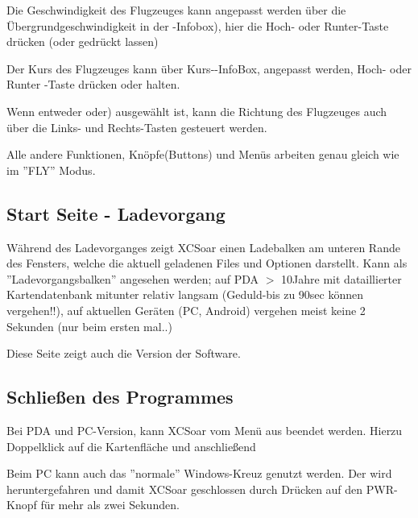 Die Geschwindigkeit des Flugzeuges kann angepasst werden über die Übergrundgeschwindigkeit in der -Infobox), hier die Hoch- oder Runter-Taste drücken (oder gedrückt lassen)

Der Kurs des Flugzeuges kann über Kurs--InfoBox, angepasst werden, Hoch- oder Runter -Taste drücken oder halten. 

Wenn entweder  oder) ausgewählt ist, 
kann die Richtung des Flugzeuges auch über die Links- und Rechts-Tasten gesteuert werden.

Alle andere Funktionen, Knöpfe(Buttons) und Menüs arbeiten genau gleich wie im ''FLY'' Modus. 


\subsection*{Start Seite - Ladevorgang}
Während des Ladevorganges zeigt {\textsf  XCSoar} einen Ladebalken am unteren Rande des Fensters, 
welche die aktuell geladenen Files und Optionen darstellt. Kann als ''Ladevorgangsbalken'' angesehen werden;  auf PDA $>$ 10Jahre mit dataillierter Kartendatenbank mitunter 
relativ langsam (Geduld-bis zu 90sec können vergehen!!), auf aktuellen Geräten (PC, Android) vergehen meist keine 2 Sekunden (nur beim ersten mal..) 

Diese Seite zeigt auch die Version der Software.

\subsection*{Schließen des Programmes}
Bei PDA und PC-Version, kann {\textsf  XCSoar} vom Menü aus beendet werden. Hierzu Doppelklick auf die Kartenfläche und anschließend 
\begin{quote}
\end{quote}

Beim PC kann auch das ''normale'' Windows-Kreuz genutzt werden.
Der \al wird heruntergefahren und damit {\textsf  XCSoar} geschlossen durch Drücken auf den PWR-Knopf für mehr als zwei Sekunden.


